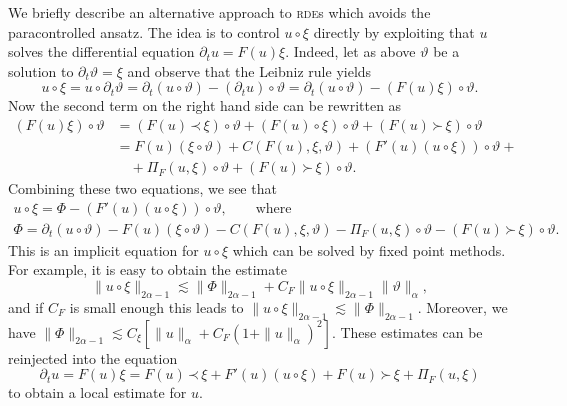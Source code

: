 \documentclass[a4paper,11pt]{article}
\theoremstyle{remark}
\newcommand{\lpara}{\,\mathord{\prec}\,}
\newcommand{\rpara}{\,\mathord{\succ}\,}
\newcommand{\reso}{\,\mathord{\circ}\,}
\begin{document}
We briefly describe an alternative approach to \textsc{rde}s which avoids the
paracontrolled ansatz. The idea is to control $u \reso   \xi$ directly by
exploiting that $u$ solves the differential equation $\partial_{t} u=F ( u ) \xi$. Indeed, let as above $\vartheta$ be a solution to $\partial_{t} \vartheta = \xi$ and observe that the Leibniz rule yields
\[
   u \reso   \xi =u \reso   \partial_{t} \vartheta = \partial_{t} ( u \reso  \vartheta ) - (\partial_{t} u) \reso \vartheta = \partial_{t} ( u \reso   \vartheta ) - ( F ( u ) \xi ) \reso   \vartheta.
\]
Now the second term on the right hand side can be rewritten as
\begin{align*}
   ( F ( u ) \xi ) \reso   \vartheta & = ( F ( u ) \lpara \xi ) \reso   \vartheta + ( F ( u ) \reso \xi ) \reso   \vartheta + ( F ( u ) \rpara \xi ) \reso  \vartheta \\
   & =F ( u ) ( \xi \reso   \vartheta ) +C ( F ( u ) , \xi , \vartheta ) + ( F'( u ) ( u \reso   \xi ) ) \reso   \vartheta + \\
   &\quad + \Pi_{F} ( u, \xi ) \reso  \vartheta + ( F ( u ) \rpara \xi ) \reso   \vartheta.
\end{align*}
Combining these two equations, we see that
\begin{gather*}
   u \reso   \xi = \Phi - ( F' ( u ) ( u \reso   \xi ) ) \reso   \vartheta , \qquad \text{where} \\
   \Phi = \partial_{t} ( u \reso   \vartheta ) -F ( u ) ( \xi \reso \vartheta ) -C ( F ( u ) , \xi , \vartheta ) - \Pi_{F} ( u, \xi ) \reso \vartheta - ( F ( u ) \rpara \xi ) \reso   \vartheta.
\end{gather*}
This is an implicit equation for $u \reso   \xi$ which can be solved by fixed point methods. For example, it is easy to obtain the estimate
\[
   \| u \reso   \xi \|_{2 \alpha -1} \lesssim \| \Phi \|_{2 \alpha -1} +C_{F} \| u \reso   \xi \|_{2 \alpha -1} \| \vartheta \|_{\alpha},
\]
and if $C_{F}$ is small enough this leads to $\| u \reso   \xi \|_{2 \alpha -1} \lesssim \| \Phi \|_{2 \alpha -1}$. Moreover, we have $\| \Phi \|_{2 \alpha -1} \lesssim C_{\xi} [ \| u \|_{\alpha} +C_{F} ( 1+ \| u \|_{\alpha} )^{2} ]$. These estimates can be
reinjected into the equation
\[
   \partial_{t} u=F ( u ) \xi =F ( u ) \lpara \xi +F' ( u ) ( u \reso   \xi ) +F ( u ) \rpara \xi + \Pi_F(u,\xi)
\]
to obtain a local estimate for $u$.
\end{document}
